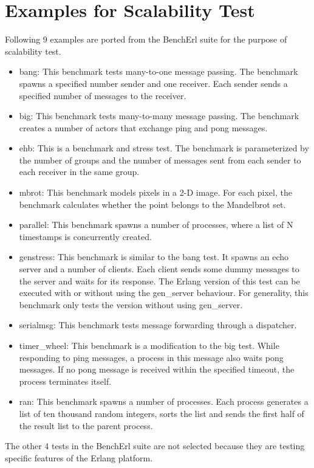 \section{Examples for Scalability Test}
\label{scalability}

Following 9 examples are ported from the BenchErl suite\cite{RELEASE} for the purpose of scalability test.

\begin{itemize}
  \item bang: This benchmark tests many-to-one message passing.  The benchmark spawns a specified number sender and one receiver.  Each sender sends a specified number of messages to the receiver. 
  \item big: This benchmark tests many-to-many message passing.  The benchmark creates a number of actors that exchange ping and pong messages.
  \item ehb: This is a benchmark and stress test.  The benchmark is parameterized by the number of groups and the number of messages sent from each sender to each receiver in the same group.
  \item mbrot: This benchmark models pixels in a 2-D image.  For each pixel, the benchmark calculates whether the point belongs to the Mandelbrot set.
  \item parallel: This benchmark spawns a number of processes, where a list of N timestamps is concurrently created.
  \item genstress: This benchmark is similar to the bang test.  It spawns an echo server and a number of clients.  Each client sends some dummy messages to the server and waits for its response.  The Erlang version of this test can be executed with or without using the gen\_server behaviour.  For generality, this benchmark only tests the version without using gen\_server.
  \item serialmsg: This benchmark tests message forwarding through a dispatcher.
  \item timer\_wheel: This benchmark is a modification to the big test.  While responding to ping messages, a process in this message also waits pong messages.  If no pong message is received within the specified timeout, the process terminates itself.  
  \item ran: This benchmark spawns a number of processes.  Each process generates a list of ten thousand random integers, sorts the list and sends the first half of the result list to the parent process.
\end{itemize}

The other 4 tests in the BenchErl suite are not selected because they are testing specific features of the Erlang platform.

